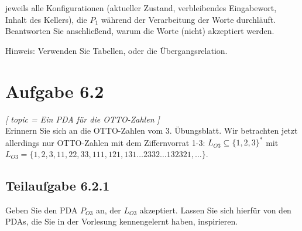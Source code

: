 \documentclass[12pt]{article}
\begin{document}
 jeweils alle Konfigurationen (aktueller Zustand, verbleibendes Eingabewort, Inhalt des Kellers), die $P_1$ während der Verarbeitung der Worte durchläuft. Beantworten Sie anschließend, warum die Worte (nicht) akzeptiert werden. 
  
 Hinweis: Verwenden Sie Tabellen, oder die Übergangsrelation. 
  
  \section*{Aufgabe 6.2}

\textit{  
[ 
 topic = Ein PDA für die OTTO-Zahlen 
 ] }\\
  
 Erinnern Sie sich an die OTTO-Zahlen vom 3. Übungsblatt. Wir betrachten jetzt allerdings nur OTTO-Zahlen mit dem Ziffernvorrat 1-3: $L_{O3} \subseteq \{1,2,3\}^*$ mit \\ $L_{O3} = \{1, 2, 3, 11, 22, 33, 111, 121, 131 \ldots 2332 \ldots 132321, \ldots \}$.  
  
 \subsection*{Teilaufgabe 6.2.1} 
 
  
 Geben Sie den PDA $P_{O3}$ an, der $L_{O3}$ akzeptiert. Lassen Sie sich hierfür von den PDAs, die Sie in der Vorlesung kennengelernt haben, inspirieren.  
  
\end{document}
